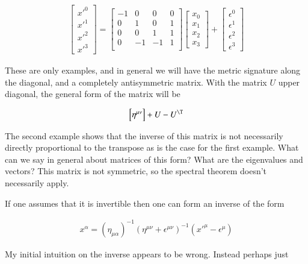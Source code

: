 \begin{align*}
\begin{bmatrix}
{x'}^0 \\
{x'}^1 \\
{x'}^2 \\
{x'}^3
\end{bmatrix}
=
\begin{bmatrix}
-1 & 0 & 0 & 0 \\ 
0 & 1 & 0 & 1 \\ 
0 & 0 & 1 & 1 \\ 
0 & -1 & -1 & 1 \\ 
\end{bmatrix}
\begin{bmatrix}
x_0 \\
x_1 \\
x_2 \\
x_3
\end{bmatrix}
+
\begin{bmatrix}
\epsilon^0 \\
\epsilon^1 \\
\epsilon^2 \\
\epsilon^3
\end{bmatrix}
\end{align*}

These are only examples, and in general we will have the metric signature along the diagonal, and a completely antisymmetric matrix.  With the matrix $U$ upper diagonal, the general form of the matrix will be

\begin{align*}
\begin{bmatrix}
\eta^{\mu\nu}
\end{bmatrix}
+ U - U^\T
\end{align*}

The second example shows that the inverse of this matrix is not necessarily directly proportional to the transpose as is the case for the first example.  What can we say in general about matrices of this form?  What are the eigenvalues and vectors?  This matrix is not symmetric, so the spectral theorem doesn't necessarily apply.

If one assumes that it is invertible then one can form an inverse of the form

\begin{align*}
x^\alpha =
(\eta_{\mu\alpha} )^{-1} (\eta^{\mu\nu} + \epsilon^{\mu\nu})^{-1} 
({x'}^\mu - \epsilon^\mu )
\end{align*}

My initial intuition on the inverse appears to be wrong.  Instead perhaps just

